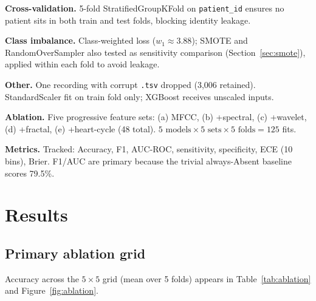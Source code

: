 \documentclass[10pt,twocolumn]{article}
\begin{document}
\textbf{Cross-validation.} 5-fold StratifiedGroupKFold on \texttt{patient\_id} ensures no patient sits in both train and test folds, blocking identity leakage.

\textbf{Class imbalance.} Class-weighted loss ($w_1 \approx 3.88$); SMOTE and RandomOverSampler also tested as sensitivity comparison (Section~\ref{sec:smote}), applied within each fold to avoid leakage.

\textbf{Other.} One recording with corrupt \texttt{.tsv} dropped (3{,}006 retained). StandardScaler fit on train fold only; XGBoost receives unscaled inputs.

\textbf{Ablation.} Five progressive feature sets: (a) MFCC, (b) +spectral, (c) +wavelet, (d) +fractal, (e) +heart-cycle (48 total). $5 \text{ models} \times 5 \text{ sets} \times 5 \text{ folds} = 125$ fits.

\textbf{Metrics.} Tracked: Accuracy, F1, AUC-ROC, sensitivity, specificity, ECE (10 bins), Brier. F1/AUC are primary because the trivial always-Absent baseline scores 79.5\%.

\section{Results}\label{sec:results}

\subsection{Primary ablation grid}

Accuracy across the $5 \times 5$ grid (mean over 5 folds) appears in Table~\ref{tab:ablation} and Figure~\ref{fig:ablation}.

\begin{table}[!htbp]
\centering
\caption{Accuracy across 5 models and 5 progressive feature sets. Bold = best per row; \underline{underline} = overall best. Standard deviations are 0.007--0.036; full table in supplementary CSV.}
\label{tab:ablation}
\end{table}
\end{document}
